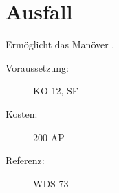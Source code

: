 \section{Ausfall}
\label{sf.ausfall}
Ermöglicht das Manöver .
\begin{description}
    \item[Voraussetzung:]
        KO 12, SF 
    \item [Kosten:]
        200 AP
    \item [Referenz:]
        WDS 73
\end{description}
